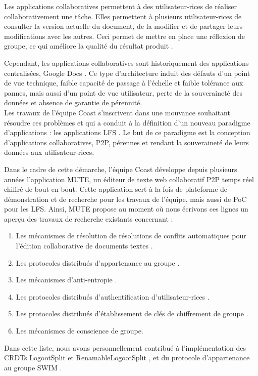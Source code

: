 Les applications collaboratives permettent à des utilisateur-rices de réaliser collaborativement une tâche.
Elles permettent à plusieurs utilisateur-rices de consulter la version actuelle du document, de la modifier et de partager leurs modifications avec les autres.
Ceci permet de mettre en place une réflexion de groupe, ce qui améliore la qualité du résultat produit \cite{2004-empirical-study-collaborative-writing,2005-internet-encyclopaedias-head-to-head}.

Cependant, les applications collaboratives sont historiquement des applications centralisées, \eg Google Docs \cite{gdocs}.
Ce type d'architecture induit des défauts d'un point de vue technique, \eg faible capacité de passage à l'échelle et faible tolérance aux pannes, mais aussi d'un point de vue utilisateur, \eg perte de la souveraineté des données et absence de garantie de pérennité.\\

Les travaux de l'équipe Coast s'inscrivent dans une mouvance souhaitant résoudre ces problèmes et qui a conduit à la définition d'un nouveau paradigme d'applications : les applications \acf{LFS} \cite{localfirstsoftware2019}.
Le but de ce paradigme est la conception d'applications collaboratives, \ac{P2P}, pérennes et rendant la souveraineté de leurs données aux utilisateur-rices.

Dans le cadre de cette démarche, l'équipe Coast développe depuis plusieurs années l'application \acf{MUTE}, un éditeur de texte web collaboratif \ac{P2P} temps réel chiffré de bout en bout.
Cette application sert à la fois de plateforme de démonstration et de recherche pour les travaux de l'équipe, mais aussi de \acf{PoC} pour les \ac{LFS}.
Ainsi, \ac{MUTE} propose au moment où nous écrivons ces lignes un aperçu des travaux de recherche existants concernant :
\begin{enumerate}
    \item Les mécanismes de résolution de résolutions de conflits automatiques pour l'édition collaborative de documents textes \cite{2013-logootsplit,2021-these-vic,2022-rls-tpds-nicolas}.
    \item Les protocoles distribués d'appartenance au groupe \cite{swim2002}.
    \item Les mécanismes d'anti-entropie \cite{1983-anti-entropy-vv}.
    \item Les protocoles distribués d'authentification d'utilisateur-rices \cite{2018-trusternity-short,2018-trusternity-long}.
    \item Les protocoles distribués d'établissement de clés de chiffrement de groupe \cite{1995-burmester-desmedt}.
    \item Les mécanismes de conscience de groupe.
\end{enumerate}
Dans cette liste, nous avons personnellement contribué à l'implémentation des \acp{CRDT} LogootSplit \cite{2013-logootsplit} et RenamableLogootSplit \cite{2022-rls-tpds-nicolas}, et du protocole d'appartenance au groupe SWIM \cite{swim2002}.\\


